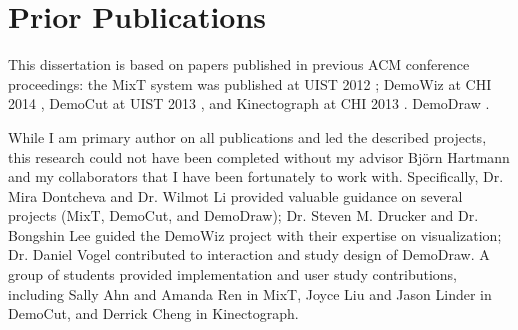 
\section {Prior Publications}

This dissertation is based on papers published in previous ACM conference proceedings: the MixT system was published at UIST 2012 \cite{Chi:2012:MAG:2380116.2380130}; DemoWiz at CHI 2014 \cite{Chi:2014:DRS:2556288.2557254}, DemoCut at UIST 2013 \cite{Chi:2013:DGC:2501988.2502052}, and Kinectograph at CHI 2013 \cite{Cheng:2013:BCC:2468356.2468568}. DemoDraw .

While I am primary author on all publications and led the described projects, this research could not have been completed without my advisor Bj\"orn Hartmann and my collaborators that I have been fortunately to work with. Specifically, Dr. Mira Dontcheva and Dr. Wilmot Li provided valuable guidance on several projects (MixT, DemoCut, and DemoDraw); Dr. Steven M. Drucker and Dr. Bongshin Lee guided the DemoWiz project with their expertise on visualization; Dr. Daniel Vogel contributed to interaction and study design of DemoDraw. A group of students provided implementation and user study contributions, including Sally Ahn and Amanda Ren in MixT, Joyce Liu and Jason Linder in DemoCut, and Derrick Cheng in Kinectograph.

